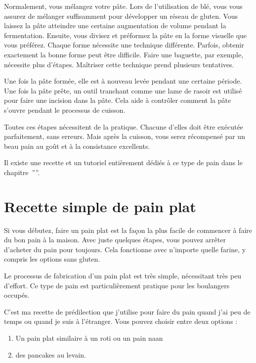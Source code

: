 Normalement, vous mélangez votre pâte. Lors de l'utilisation de blé, vous vous assurez de mélanger suffisamment pour développer un réseau de gluten. Vous laissez la pâte atteindre une certaine augmentation de volume pendant la fermentation. Ensuite, vous divisez et préformez la pâte en la forme visuelle que vous préférez. Chaque forme nécessite une technique différente. Parfois, obtenir exactement la bonne forme peut être difficile. Faire une baguette, par exemple, nécessite plus d'étapes. Maîtriser cette technique prend plusieurs tentatives.

Une fois la pâte formée, elle est à nouveau levée pendant une certaine période. Une fois la pâte prête, un outil tranchant comme une lame de rasoir est utilisé pour faire une incision dans la pâte. Cela aide à contrôler comment la pâte s'ouvre pendant le processus de cuisson.

Toutes ces étapes nécessitent de la pratique. Chacune d'elles doit être exécutée parfaitement, sans erreurs. Mais après la cuisson, vous serez récompensé par un beau pain au goût et à la consistance excellents.

Il existe une recette et un tutoriel entièrement dédiés à ce type de pain dans le chapitre~''''.\section{Recette simple de pain plat}%
\label{section:flat-bread-recipe}

Si vous débutez, faire un pain plat est la
façon la plus facile de commencer à faire du bon pain à la maison. Avec juste quelques
étapes, vous pouvez arrêter d'acheter du pain pour toujours. Cela fonctionne avec
n'importe quelle farine, y compris les options sans gluten.

\begin{flowchart}[!htb]
\begin{center}
  
  \caption[Processus de pain plat]{Le processus de fabrication d'un pain plat est très
      simple, nécessitant très peu d'effort. Ce type de pain est particulièrement
      pratique pour les boulangers occupés.}%
  \label{fig:flat-bread-process}
\end{center}
\end{flowchart}

C'est ma recette de prédilection que j'utilise pour faire du pain quand
j'ai peu de temps ou quand je suis à l'étranger. Vous pouvez choisir
entre deux options :
%
\begin{enumerate}
    \item Un pain plat similaire à un roti ou un pain naan
    \item des pancakes au levain.
\end{enumerate}

